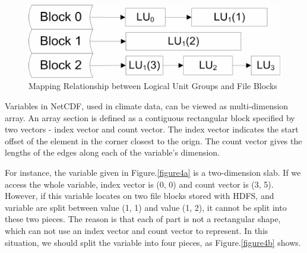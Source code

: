 \documentclass[preprint,12pt]{elsarticle}
\begin{document}
\begin{figure}
	\centering
	\includegraphics{figure3}
	\caption{Mapping Relationship between Logical Unit Groups and File Blocks}
	\label{figure3}
\end{figure}

Variables in NetCDF, used in climate data, can be viewed as multi-dimension array. An array section is defined as a contiguous rectangular
block specified by two vectors - index vector and count vector. The index vector indicates the start offset of the element in the corner
closest to the orign. The count vector gives the lengths of the edges along each of the variable's dimension. \par
For instance, the variable given in Figure.\ref{figure4a} is a two-dimension slab. If we access the whole variable, index vector is (0, 0) 
and count vector is (3, 5). However, if this variable locates on two file blocks stored with HDFS, and variable are split between value 
(1, 1) and value (1, 2), it cannot be split into these two pieces. The reason is that each of part is not a rectangular shape, which 
can not use an index vector and count vector to represent. In this situation, we should split the variable into four pieces, as 
Figure.\ref{figure4b} shows.
\end{document}
